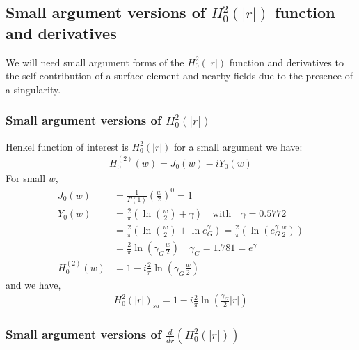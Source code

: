 \documentclass{article}
\newcommand{\0}{\varnothing}
\begin{document}
\newpage
\subsection{Small argument versions of $H_0^2(|r|)$ function and derivatives}

We will need small argument forms of the $H_0^2(|r|)$ function and derivatives to the self-contribution of a surface element and nearby fields due to the presence of a singularity. 

\subsubsection{Small argument versions of $H_0^2(|r|)$}

Henkel function of interest is $H_0^2(|r|)$ for a small argument we have:
\begin{align*}
    H_0^{(2)}(w) = J_0(w) - i Y_0(w) 
\end{align*}
For small $w$,
\begin{align*}
    J_0(w) &= \frac{1}{\Gamma(1)} \left(\frac{w}{2}\right)^0 = 1\\
    Y_0(w) &= \frac{2}{\pi} \left(\ln \left( \frac{w}{2}\right) + \gamma\right) \quad \text{with} \quad \gamma = 0.5772\\
           &= \frac{2}{\pi} \left(\ln \left( \frac{w}{2}\right) + \ln e^\gamma_G \right) = \frac{2}{\pi} \left(\ln \left( e^\gamma_G \frac{w}{2}\right) \right) \\
           &= \frac{2}{\pi} \ln \left( \gamma_G \frac{w}{2} \right) \quad \gamma_G = 1.781 = e^\gamma\\
    H_0^{(2)}(w) &= 1 - i \frac{2}{\pi} \ln \left( \gamma_G \frac{w}{2} \right)
\end{align*}
and we have,
\begin{align*}
    H_0^2(|r|)_{sa} = 1 - i \frac{2}{\pi} \ln \left(\frac{\gamma_G}{2} |r| \right)
\end{align*}

\subsubsection{Small argument versions of $\frac{d}{dr}(H_0^2(|r|))$}
\end{document}
